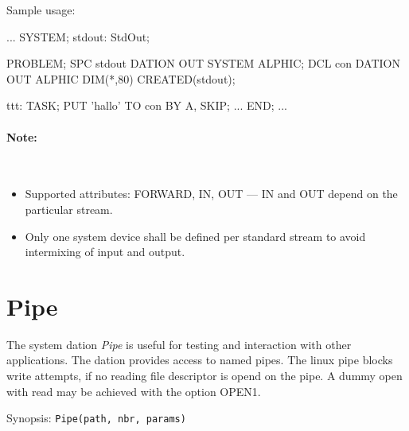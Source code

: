 Sample usage:
\begin{PEARLCode}
...
SYSTEM;
  stdout: StdOut;

PROBLEM;
   SPC stdout DATION OUT SYSTEM ALPHIC;
   DCL con    DATION OUT ALPHIC DIM(*,80) CREATED(stdout);

ttt: TASK;
   PUT 'hallo' TO con BY A, SKIP;
...
END;
...
\end{PEARLCode}

\paragraph{Note:}\ 
\begin{itemize}
\item Supported attributes: FORWARD, IN, OUT --- IN and OUT depend on the
particular stream.
\item Only one system device shall be defined per standard stream to avoid
intermixing of input and output.
\end{itemize}

\section{Pipe}
The system dation {\em Pipe} is useful for testing and interaction with
other applications. The dation provides access to named pipes.
The linux pipe blocks write attempts, if no reading file descriptor
is opend on the pipe. 
A dummy open with read may be achieved with the option OPEN1.

Synopsis: \verb|Pipe(path, nbr, params)|

